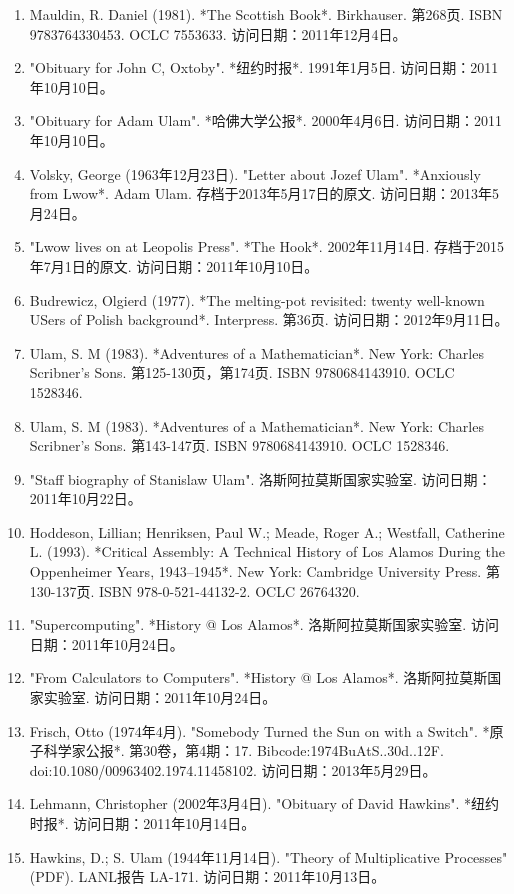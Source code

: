 \begin{enumerate}
\item Mauldin, R. Daniel (1981). *The Scottish Book*. Birkhauser. 第268页. ISBN 9783764330453. OCLC 7553633. 访问日期：2011年12月4日。
\item "Obituary for John C, Oxtoby". *纽约时报*. 1991年1月5日. 访问日期：2011年10月10日。
\item "Obituary for Adam Ulam". *哈佛大学公报*. 2000年4月6日. 访问日期：2011年10月10日。
\item Volsky, George (1963年12月23日). "Letter about Jozef Ulam". *Anxiously from Lwow*. Adam Ulam. 存档于2013年5月17日的原文. 访问日期：2013年5月24日。
\item "Lwow lives on at Leopolis Press". *The Hook*. 2002年11月14日. 存档于2015年7月1日的原文. 访问日期：2011年10月10日。
\item Budrewicz, Olgierd (1977). *The melting-pot revisited: twenty well-known USers of Polish background*. Interpress. 第36页. 访问日期：2012年9月11日。
\item Ulam, S. M (1983). *Adventures of a Mathematician*. New York: Charles Scribner's Sons. 第125-130页，第174页. ISBN 9780684143910. OCLC 1528346.
\item Ulam, S. M (1983). *Adventures of a Mathematician*. New York: Charles Scribner's Sons. 第143-147页. ISBN 9780684143910. OCLC 1528346.
\item "Staff biography of Stanislaw Ulam". 洛斯阿拉莫斯国家实验室. 访问日期：2011年10月22日。
\item Hoddeson, Lillian; Henriksen, Paul W.; Meade, Roger A.; Westfall, Catherine L. (1993). *Critical Assembly: A Technical History of Los Alamos During the Oppenheimer Years, 1943–1945*. New York: Cambridge University Press. 第130-137页. ISBN 978-0-521-44132-2. OCLC 26764320.
\item "Supercomputing". *History @ Los Alamos*. 洛斯阿拉莫斯国家实验室. 访问日期：2011年10月24日。
\item "From Calculators to Computers". *History @ Los Alamos*. 洛斯阿拉莫斯国家实验室. 访问日期：2011年10月24日。
\item Frisch, Otto (1974年4月). "Somebody Turned the Sun on with a Switch". *原子科学家公报*. 第30卷，第4期：17. Bibcode:1974BuAtS..30d..12F. doi:10.1080/00963402.1974.11458102. 访问日期：2013年5月29日。
\item Lehmann, Christopher (2002年3月4日). "Obituary of David Hawkins". *纽约时报*. 访问日期：2011年10月14日。
\item Hawkins, D.; S. Ulam (1944年11月14日). "Theory of Multiplicative Processes" (PDF). LANL报告 LA-171. 访问日期：2011年10月13日。

\end{enumerate}
